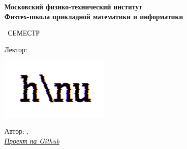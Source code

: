 \begin{titlepage}
	\clearpage\thispagestyle{empty}
	\centering
	
	\textbf{Московский физико-технический институт \\ Физтех-школа прикладной математики и информатики}
	\vspace{33ex}
	
	{\textbf{\FullCourseNameFirstPart}}
	
	\SemesterNumber\ СЕМЕСТР  
	\vspace{1ex}
	
	Лектор: \textit{\LecturerInitials}
	
	\ifdefined\nologo\else
		\includegraphics[width=0.4\textwidth]{images/logo_ltc.png}
	\fi

	\begin{flushright}
		\noindent
		Автор: \href{\VKLink}{\textit{\AuthorInitials}}, \href{\VKLinksecond}{\textit{\AuthorInitialssecond}}
		\\
		\href{\GithubLink}{\textit{Проект на Github}}
	\end{flushright}
	
	\vfill
	\CourseDate
	\pagebreak
\end{titlepage}
